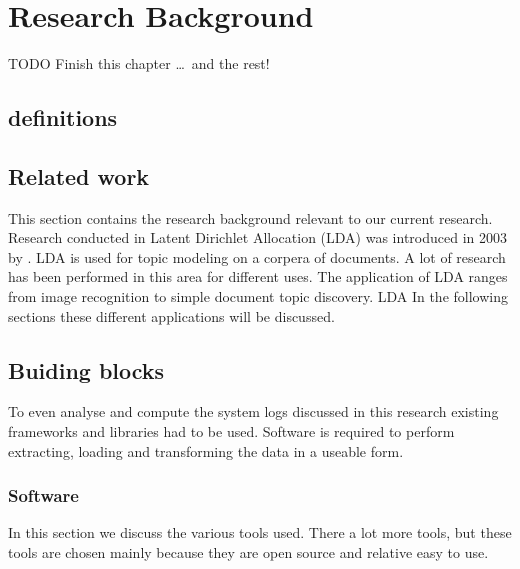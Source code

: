 \chapter{Research Background}  \label{ch:theory}

TODO Finish this chapter \ldots\ and the rest!


\section{definitions}

\section{Related work}  

This section contains the research background relevant to our current research. Research conducted in 
Latent Dirichlet Allocation (LDA) was introduced in 2003 by \cite{Blei2003LatentAllocation}. LDA is used for topic modeling on a corpera of documents. A lot of research has been performed in this area for different uses. The application of LDA ranges from image recognition to simple document topic discovery. LDA  In the following sections these different applications will be discussed.






\section{Buiding blocks}
To even analyse and compute the system logs discussed in this research existing frameworks and libraries had to be used. Software is required to perform extracting, loading and transforming the data in a useable form.

\subsection{Software}
In this section we discuss the various tools used. There a lot more tools, but these tools are chosen mainly because they are open source and relative easy to use.

